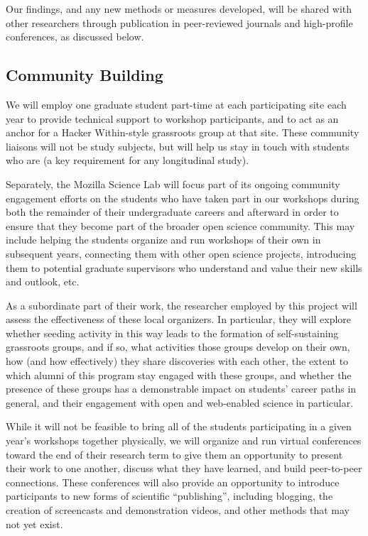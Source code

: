\documentclass{proposalnsf}
\newlength{\up}
\begin{document}
Our findings, and any new methods or measures developed, will be
shared with other researchers through publication in peer-reviewed
journals and high-profile conferences, as discussed below.

\subsection{Community Building}

We will employ one graduate student part-time at each participating
site each year to provide technical support to workshop participants,
and to act as an anchor for a Hacker Within-style grassroots group at
that site.  These community liaisons will not be study subjects, but
will help us stay in touch with students who are (a key requirement
for any longitudinal study).

Separately, the Mozilla Science Lab will focus part of its ongoing
community engagement efforts on the students who have taken part in
our workshops during both the remainder of their undergraduate careers
and afterward in order to ensure that they become part of the broader
open science community.  This may include helping the students
organize and run workshops of their own in subsequent years,
connecting them with other open science projects, introducing them to
potential graduate supervisors who understand and value their new
skills and outlook, etc.

As a subordinate part of their work, the researcher employed by this
project will assess the effectiveness of these local organizers.  In
particular, they will explore whether seeding activity in this way
leads to the formation of self-sustaining grassroots groups, and if
so, what activities those groups develop on their own, how (and how
effectively) they share discoveries with each other, the extent to
which alumni of this program stay engaged with these groups, and
whether the presence of these groups has a demonstrable impact on
students' career paths in general, and their engagement with open and
web-enabled science in particular.

While it will not be feasible to bring all of the students
participating in a given year's workshops together physically, we will
organize and run virtual conferences toward the end of their research
term to give them an opportunity to present their work to one another,
discuss what they have learned, and build peer-to-peer connections.
These conferences will also provide an opportunity to introduce
participants to new forms of scientific ``publishing'', including
blogging, the creation of screencasts and demonstration videos, and
other methods that may not yet exist.
\end{document}
